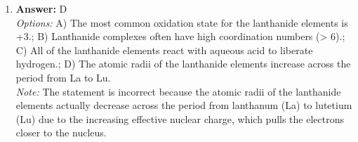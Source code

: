\documentclass[12pt]{article}
\begin{document}
\begin{enumerate}[label=\arabic*.]
\\ \textit{Options:} A) HCl / NaOH; B) H$_{3}$O+ / H$_{2}$O; C) O$_{2}$ / H$_{2}$O; D) H+ / Cl-
\\ \textit{Note:} H$_{3}$O+ and H$_{2}$O are classified as a conjugate acid-base pair because H$_{3}$O+ is the protonated form (conjugate acid) of H$_{2}$O, which can donate a proton to become H$_{3}$O+.
\item \textbf{Answer:} D
\\ \textit{Options:} A) The most common oxidation state for the lanthanide elements is +3.; B) Lanthanide complexes often have high coordination numbers (\textgreater{} 6).; C) All of the lanthanide elements react with aqueous acid to liberate hydrogen.; D) The atomic radii of the lanthanide elements increase across the period from La to Lu.
\\ \textit{Note:} The statement is incorrect because the atomic radii of the lanthanide elements actually decrease across the period from lanthanum (La) to lutetium (Lu) due to the increasing effective nuclear charge, which pulls the electrons closer to the nucleus.
\end{enumerate}
\end{document}
